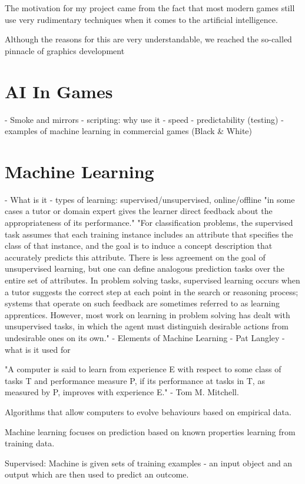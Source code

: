 \documentclass[a4paper,oneside]{report}
\begin{document}
The motivation for my project came from the fact that most modern games still use very rudimentary techniques when it comes to the artificial intelligence.

Although the reasons for this are very understandable, we reached the so-called pinnacle of graphics development 


\section{AI In Games}
- Smoke and mirrors
- scripting: why use it
	- speed
	- predictability (testing) 
- examples of machine learning in commercial games (Black \& White)

\section{Machine Learning}

- What is it
- types of learning: supervised/unsupervised, online/offline
"in some cases a tutor or domain expert gives the learner direct feedback about the appropriateness of its performance."
"For classification problems, the supervised task assumes that each training instance includes an attribute that specifies the class of that instance, and the goal is to induce a concept description that accurately predicts this attribute. There is less agreement on the goal of unsupervised learning, but one can define analogous prediction tasks over the entire set of attributes. In problem solving tasks, supervised learning occurs when a tutor suggests the correct step at each point in the search or reasoning process; systems that operate on such feedback are sometimes referred to as learning apprentices. However, most work on learning in problem solving has dealt with unsupervised tasks, in which the agent must distinguish desirable actions from undesirable ones on its own." - Elements of Machine Learning - Pat Langley
- what is it used for 

"A computer is said to learn from experience E with respect to some class of tasks T and performance measure P, if its performance at tasks in T, as measured by P, improves with experience E." - Tom M. Mitchell.

Algorithms that allow computers to evolve behaviours based on empirical data.

Machine learning focuses on prediction based on known properties learning from training data.

Supervised: Machine is given sets of training examples - an input object and an output which are then used to predict an outcome.
\end{document}
